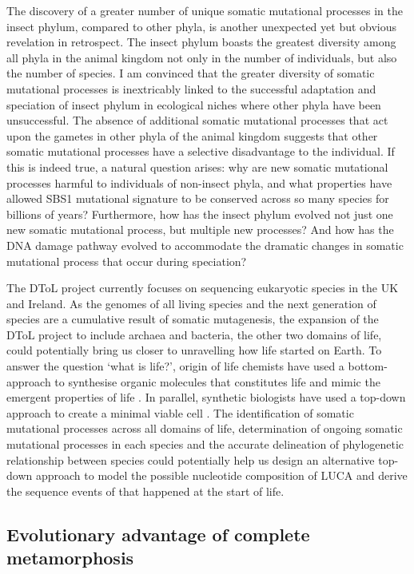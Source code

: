 The discovery of a greater number of unique somatic mutational processes in the insect phylum, compared to other phyla, is another unexpected yet but obvious revelation in retrospect. The insect phylum boasts the greatest diversity among all phyla in the animal kingdom not only in the number of individuals, but also the number of species. I am convinced that the greater diversity of somatic mutational processes is inextricably linked to the successful adaptation and speciation of insect phylum in ecological niches where other phyla have been unsuccessful. The absence of additional somatic mutational processes that act upon the gametes in other phyla of the animal kingdom suggests that other somatic mutational processes have a selective disadvantage to the individual. If this is indeed true, a natural question arises: why are new somatic mutational processes harmful to individuals of non-insect phyla, and what properties have allowed SBS1 mutational signature to be conserved across so many species for billions of years? Furthermore, how has the insect phylum evolved not just one new somatic mutational process, but multiple new processes? And how has the DNA damage pathway evolved to accommodate the dramatic changes in somatic mutational process that occur during speciation? 

The DToL project currently focuses on sequencing eukaryotic species in the UK and Ireland. As the genomes of all living species and the next generation of species are a cumulative result of somatic mutagenesis, the expansion of the DToL project to include archaea and bacteria, the other two domains of life, could potentially bring us closer to unravelling how life started on Earth. To answer the question ‘what is life?’, origin of life chemists have used a bottom-approach to synthesise organic molecules that constitutes life and mimic the emergent properties of life \cite{Miller1953-gt}. In parallel, synthetic biologists have used a top-down approach to create a minimal viable cell \cite{Hutchison2016-el}. The identification of somatic mutational processes across all domains of life, determination of ongoing somatic mutational processes in each species and the accurate delineation of phylogenetic relationship between species could potentially help us design an alternative top-down approach to model the possible nucleotide composition of LUCA and derive the sequence events of that happened at the start of life. 

\subsection{Evolutionary advantage of complete metamorphosis}

